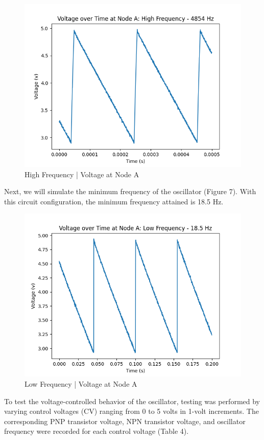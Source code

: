 \documentclass{article}
\begin{document}
\begin{figure}[H]
  \centering
  \includegraphics[width=.7\linewidth]{png/Figure_5.png}
  \caption{High Frequency | Voltage at Node A}
\end{figure}

Next, we will simulate the minimum frequency of the oscillator (Figure 7). With this circuit configuration, the minimum frequency attained is 18.5 Hz.

\begin{figure}[H]
  \centering
  \includegraphics[width=.7\linewidth]{png/Figure_4.png}
  \caption{Low Frequency | Voltage at Node A}
\end{figure}

To test the voltage-controlled behavior of the oscillator, testing was performed by varying control voltages (CV) ranging from 0 to 5 volts in 1-volt increments. The corresponding PNP transistor voltage, NPN transistor voltage, and oscillator frequency were recorded for each control voltage (Table 4).
\end{document}
